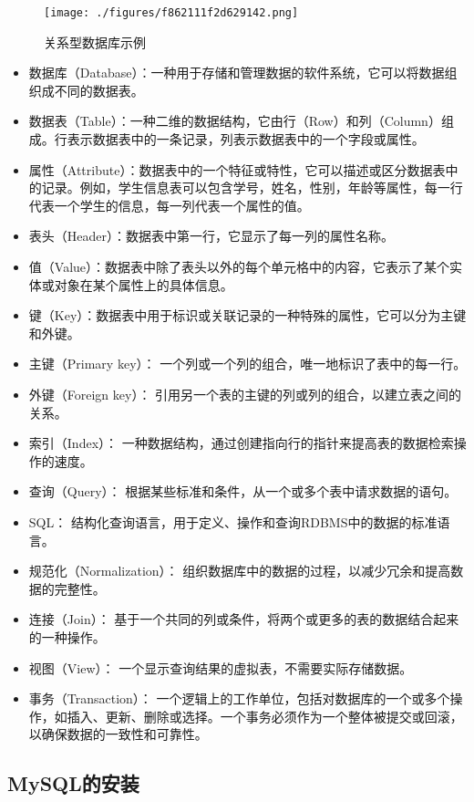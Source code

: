 \begin{figure}[ht]
\centering
\texttt{[image: ./figures/f862111f2d629142.png]}
\caption{关系型数据库示例} \label{fig_DBS001_2}
\end{figure}
\begin{itemize}
\item 数据库（Database）：一种用于存储和管理数据的软件系统，它可以将数据组织成不同的数据表。
\item 数据表（Table）：一种二维的数据结构，它由行（Row）和列（Column）组成。行表示数据表中的一条记录，列表示数据表中的一个字段或属性。
\item 属性（Attribute）：数据表中的一个特征或特性，它可以描述或区分数据表中的记录。例如，学生信息表可以包含学号，姓名，性别，年龄等属性，每一行代表一个学生的信息，每一列代表一个属性的值。
\item 表头（Header）：数据表中第一行，它显示了每一列的属性名称。
\item 值（Value）：数据表中除了表头以外的每个单元格中的内容，它表示了某个实体或对象在某个属性上的具体信息。
\item 键（Key）：数据表中用于标识或关联记录的一种特殊的属性，它可以分为主键和外键。
\item 主键（Primary key）： 一个列或一个列的组合，唯一地标识了表中的每一行。
\item 外键（Foreign key）： 引用另一个表的主键的列或列的组合，以建立表之间的关系。
\item 索引（Index）： 一种数据结构，通过创建指向行的指针来提高表的数据检索操作的速度。
\item 查询（Query）： 根据某些标准和条件，从一个或多个表中请求数据的语句。
\item SQL： 结构化查询语言，用于定义、操作和查询RDBMS中的数据的标准语言。
\item 规范化（Normalization）： 组织数据库中的数据的过程，以减少冗余和提高数据的完整性。
\item 连接（Join）： 基于一个共同的列或条件，将两个或更多的表的数据结合起来的一种操作。
\item 视图（View）： 一个显示查询结果的虚拟表，不需要实际存储数据。
\item 事务（Transaction）： 一个逻辑上的工作单位，包括对数据库的一个或多个操作，如插入、更新、删除或选择。一个事务必须作为一个整体被提交或回滚，以确保数据的一致性和可靠性。
\end{itemize}

\subsection{MySQL的安装}

